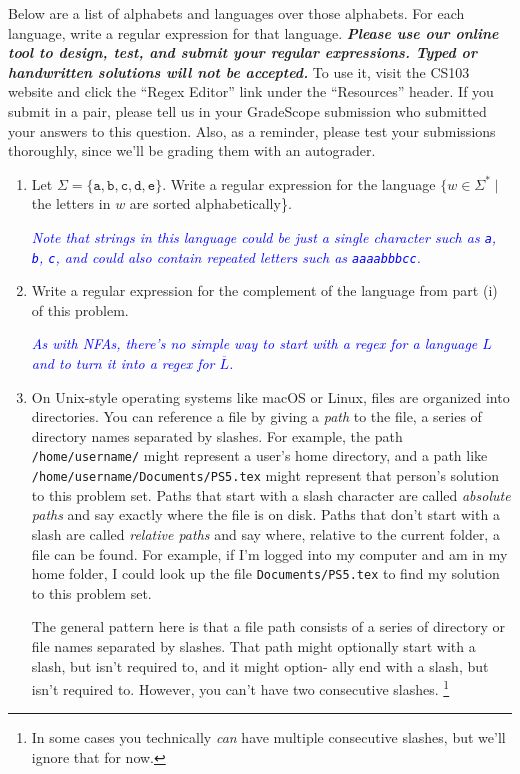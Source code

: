 \documentclass{article}
\renewcommand{\(}{\left(}
\renewcommand{\)}{\right)}
\theoremstyle{plain}
\theoremstyle{plain}
\theoremstyle{definition}
\renewcommand{\emph}[1]{\textit{\textbf{#1}}}
\newcommand{\annotate}[1]{\textit{\textcolor{blue}{#1}}}
\newcommand{\ttt}[1]{\texttt{#1}}
\begin{document}
Below are a list of alphabets and languages over those alphabets. For each language, write a regular expression for that language. \emph{Please use our online tool to design, test, and submit your regular expressions. Typed or handwritten solutions will not be accepted.} To use it, visit the CS103 website and click the ``Regex Editor'' link under the ``Resources'' header. If you submit in a pair, please tell us in your GradeScope submission who submitted your answers to this question. Also, as a reminder, please test your submissions thoroughly, since we'll be grading them with an autograder.

\begin{enumerate}[label*=\roman*.,ref=\roman*]
    \item Let $\Sigma = \{\ttt{a}, \ttt{b}, \ttt{c}, \ttt{d}, \ttt{e}\}$. Write a regular expression for the language $\{w \in \Sigma^* \mid $ the letters in $w$ are sorted alphabetically\}. 
    
    \annotate{Note that strings in this language could be just a single character such as \ttt{a}, \ttt{b}, \ttt{c}, and could also contain repeated letters such as \ttt{aaaabbbcc}.}
    
    \item Write a regular expression for the complement of the language from part (i) of this problem.
    
    \annotate{As with NFAs, there's no simple way to start with a regex for a language $L$ and to turn it into a regex for $\overline{L}$.}
    
    \item On Unix-style operating systems like macOS or Linux, files are organized into directories. You can reference a file by giving a \textit{path} to the file, a series of directory names separated by slashes. For example, the path \ttt{/home/username/} might represent a user's home directory, and a path like \ttt{/home/username/Documents/PS5.tex} might represent that person's solution to this problem set. Paths that start with a slash character are called \textit{absolute paths} and say exactly where the file is on disk. Paths that don't start with a slash are called \textit{relative paths} and say where, relative to the current folder, a file can be found. For example, if I'm logged into my computer and am in my home folder, I could look up the file \ttt{Documents/PS5.tex} to find my solution to this problem set.
    
    The general pattern here is that a file path consists of a series of directory or file names separated by slashes. That path might optionally start with a slash, but isn't required to, and it might option- ally end with a slash, but isn't required to. However, you can't have two consecutive slashes. \footnote{In some cases you technically \textit{can} have multiple consecutive slashes, but we'll ignore that for now.}
    

\end{enumerate}
\end{document}
